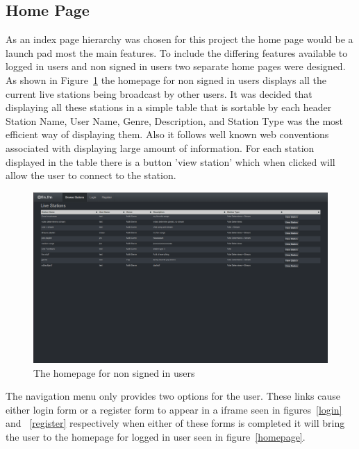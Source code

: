 \documentclass[a4paper, 12pt]{report}
\begin{document}
\subsection{Home Page}
As an index page hierarchy was chosen for this project the home page would be a launch pad most the main features. To include the differing features available to logged in users and non signed in users two separate home pages were designed. As shown in Figure~\ref{homepage-anon} the homepage for non signed in users displays all the current live stations being broadcast by other users. It was decided that displaying all these stations in a simple table that is sortable by each header Station Name, User Name, Genre, Description, and Station Type was the most efficient way of displaying them. Also it follows well known web conventions associated with displaying large amount of information. For each station displayed in the table there is a button 'view station' which when clicked will allow the user to connect to the station. \\
\begin{figure}[H]
  \centering
    \includegraphics[width=1.0\textwidth]{screenshots/homepage-anon.png}
    \caption{The homepage for non signed in users}
    \label{homepage-anon}
\end{figure}
The navigation menu only provides two options for the user. These links cause either login form or a register form to appear in a iframe seen in figures~\ref{login} and ~\ref{register} respectively when either of these forms is completed it will bring the user to the homepage for logged in user seen in figure~\ref{homepage}.\\
\end{document}
